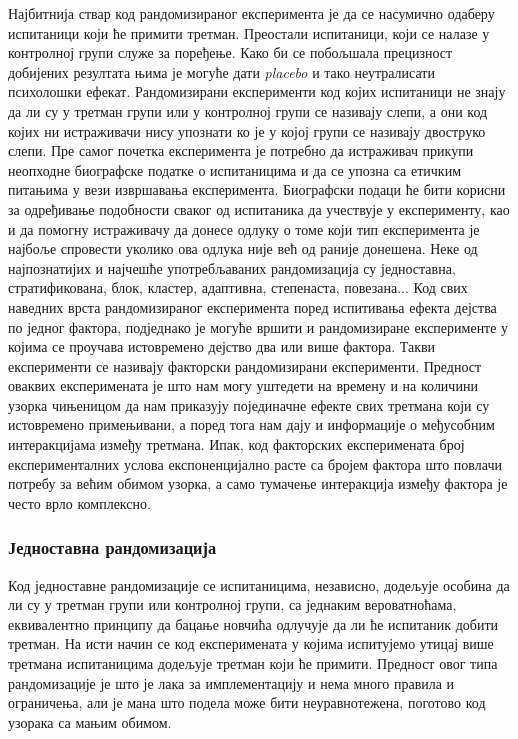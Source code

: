 \documentclass[12pt, a4paper]{article}
\begin{document}
Најбитнија ствар код рандомизираног експеримента је да се насумично одаберу испитаници који ће 
примити третман. Преостали испитаници, који се налазе у контролној групи служе за поређење. 
Како би се побољшала прецизност добијених резултата њима је могуће дати \textit{placebo} и тако 
неутралисати психолошки ефекат. Рандомизирани експерименти код којих испитаници не знају да ли су 
у третман групи или у контролној групи се називају слепи, а они код којих ни истраживачи нису 
упознати ко је у којој групи се називају двоструко слепи. Пре самог почетка експеримента је 
потребно да истраживач прикупи неопходне биографске податке о испитаницима и да се упозна са 
етичким питањима у вези извршавања експеримента. Биографски подаци ће бити корисни за одређивање 
подобности сваког од испитаника да учествује у експерименту, као и да помогну истраживачу да 
донесе одлуку о томе који тип експеримента је најбоље спровести уколико ова одлука није већ од 
раније донешена. Неке од најпознатијих и најчешће употребљаваних рандомизација су једноставна, 
стратификована, блок, кластер, адаптивна, степенаста, повезана...
Код свих наведних врста рандомизираног експеримента поред испитивања ефекта дејства по једног 
фактора, подједнако је могуће вршити и рандомизиране експерименте у којима се проучава 
истовремено дејство два или више фактора. Такви експерименти се називају факторски рандомизирани 
експерименти. Предност оваквих експеримената је што нам могу уштедети на времену и на количини 
узорка чињеницом да нам приказују појединачне ефекте свих третмана који су истовремено примењивани, 
а поред тога нам дају и информације о међусобним интеракцијама између третмана. Ипак, код 
факторских експеримената број експерименталних услова експоненцијално расте са бројем фактора што 
повлачи потребу за већим обимом узорка, а само тумачење интеракција између фактора је често врло 
комплексно.

\subsubsection{Једноставна рандомизација}

Код једноставне рандомизације се испитаницима, независно, додељује особина да ли су у третман 
групи или контролној групи, са једнаким вероватноћама, еквивалентно принципу да бацање новчића 
одлучује да ли ће испитаник добити третман. На исти начин се код експеримената у којима испитујемо 
утицај више третмана испитаницима додељује третман који ће примити.
Предност овог типа рандомизације је што је лака за имплементацију и нема много правила и 
ограничења, али је мана што подела може бити неуравнотежена, поготово код узорака са мањим обимом.
\end{document}
